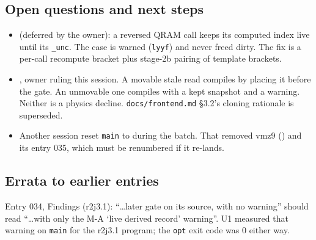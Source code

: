 \subsection*{Open questions and next steps}
\begin{itemize}
  \item {} (deferred by the owner): a reversed
  QRAM call keeps its computed index live until its \texttt{\_unc}. The case
  is warned (\texttt{lyyf}) and never freed dirty. The fix is a per-call
  recompute bracket plus stage-2b pairing of template brackets.
  \item {}, owner ruling this session. A movable
  stale read compiles by placing it before the gate. An unmovable one
  compiles with a kept snapshot and a warning. Neither is a physics decline.
  \texttt{docs/frontend.md} \S3.2's cloning rationale is superseded.
  \item Another session reset \texttt{main} to  during the
  batch. That removed vmz9 () and its entry 035, which must
  be renumbered if it re-lands.
\end{itemize}

\subsection*{Errata to earlier entries}
Entry 034, Findings (r2j3.1): ``\ldots later gate on its source, with no
warning'' should read ``\ldots with only the M-A `live derived record'
warning''. U1 measured that warning on \texttt{main} for the r2j3.1 program;
the \texttt{opt} exit code was 0 either way.
